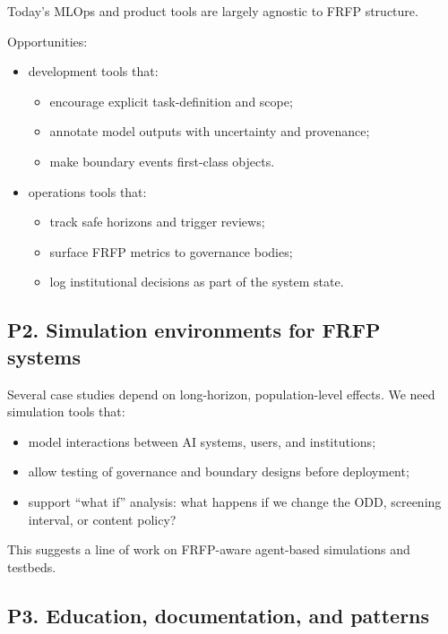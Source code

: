Today’s MLOps and product tools are largely agnostic to FRFP
structure.

Opportunities:

\begin{itemize}
  \item development tools that:
        \begin{itemize}
          \item encourage explicit task-definition and scope;
          \item annotate model outputs with uncertainty and provenance;
          \item make boundary events first-class objects.
        \end{itemize}
  \item operations tools that:
        \begin{itemize}
          \item track safe horizons and trigger reviews;
          \item surface FRFP metrics to governance bodies;
          \item log institutional decisions as part of the system
                state.
        \end{itemize}
\end{itemize}

\subsection{P2. Simulation environments for FRFP systems}

Several case studies depend on long-horizon, population-level
effects.
We need simulation tools that:

\begin{itemize}
  \item model interactions between AI systems, users, and institutions;
  \item allow testing of governance and boundary designs before
        deployment;
  \item support ``what if'' analysis:
        what happens if we change the ODD, screening interval, or
        content policy?
\end{itemize}

This suggests a line of work on FRFP-aware agent-based simulations and
testbeds.

\subsection{P3. Education, documentation, and patterns}

